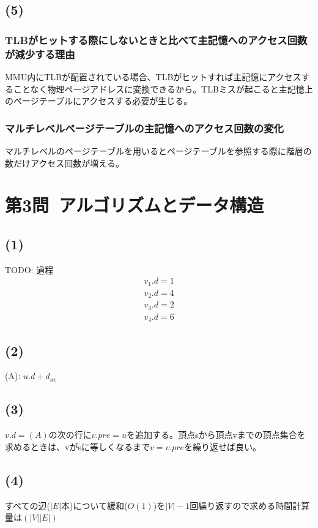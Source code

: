 \documentclass[a4paper,12pt,xelatex,ja=standard]{bxjsarticle}
\begin{document}
\subsection*{(5)}
\subsubsection*{TLBがヒットする際にしないときと比べて主記憶へのアクセス回数が減少する理由}
MMU内にTLBが配置されている場合、TLBがヒットすれば主記憶にアクセスすることなく物理ページアドレスに変換できるから。TLBミスが起こると主記憶上のページテーブルにアクセスする必要が生じる。

\subsubsection*{マルチレベルページテーブルの主記憶へのアクセス回数の変化}
マルチレベルのページテーブルを用いるとページテーブルを参照する際に階層の数だけアクセス回数が増える。

\section*{第3問\ アルゴリズムとデータ構造}
\subsection*{(1)}
TODO: 過程\\
\begin{equation*}
  \begin{split}
    v_1.d = 1 \\
    v_2.d = 4 \\
    v_3.d = 2 \\
    v_4.d = 6
  \end{split}
\end{equation*}

\subsection*{(2)}
(A): $u.d + d_{uv}$

\subsection*{(3)}
$v.d = (A)$の次の行に$v.pre = u$を追加する。頂点sから頂点vまでの頂点集合を求めるときは、vがsに等しくなるまで$v = v.pre$を繰り返せば良い。

\subsection*{(4)}
すべての辺($|E|$本)について緩和($O(1)$)を$|V| - 1$回繰り返すので求める時間計算量は$(|V||E|)$
\end{document}
